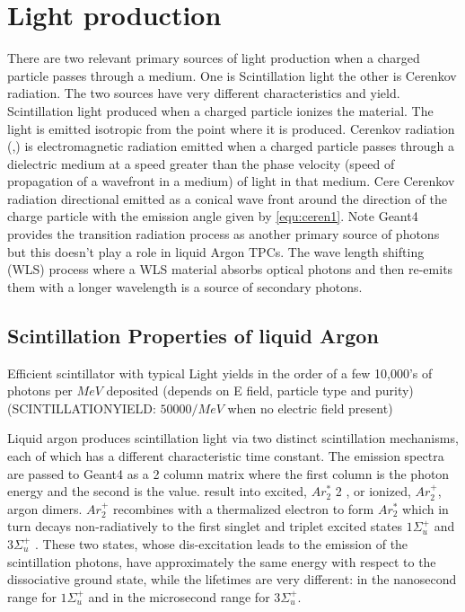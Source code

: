 \documentclass{article}
\begin{document}
  \section{Light production}
  There are two relevant primary sources of light production when a charged particle passes through a medium.
One is Scintillation light the other is Cerenkov radiation.
The two sources have very different characteristics and yield.
Scintillation light produced when a  charged particle ionizes the material. The light is emitted isotropic from the point where it is produced. 
  Cerenkov radiation (\cite{ref:pdg},\cite{ref:wikipedia}) is electromagnetic radiation emitted when a charged particle passes through a dielectric medium at a speed greater than the phase velocity
  (speed of propagation of a wavefront in a medium) of light in that medium. Cere Cerenkov radiation directional  emitted as a conical wave front around the direction of the charge particle with
  the emission angle given by \ref{equ:ceren1}.
  Note Geant4 provides the transition radiation process as another primary source of photons but this doesn't play a role in liquid Argon TPCs.
  The wave length shifting (WLS) process where a WLS material absorbs optical photons and then re-emits them with a longer wavelength is a source of secondary photons. 
  
  
 

  

  \subsection{Scintillation Properties of liquid Argon}

  Efficient scintillator with typical Light yields in the order of a few 10,000’s of photons per $MeV$  deposited (depends on E field, particle type and purity)
  (SCINTILLATIONYIELD: $50000/MeV$ when no electric field present)

  
  Liquid argon produces scintillation light via two distinct scintillation mechanisms, each
  of which has a different characteristic time constant.
  The emission spectra are passed to Geant4
  as a 2 column matrix where the first column is the photon energy and the second is the value.
  result into excited, $Ar^{\ast}_2$ 2 , or ionized, $Ar^+_2$, argon dimers.
$Ar^+_2$ recombines with a thermalized electron
to form $Ar^{\ast}_2$ 
which in turn decays non-radiatively to the first
singlet and triplet excited states  $1\Sigma^+_u$ and  $3\Sigma^+_u$ . These
two states, whose dis-excitation leads to the emission of
the scintillation photons, have approximately the same
energy with respect to the dissociative ground state,
while the lifetimes are very different: in the nanosecond
range for $1\Sigma^+_u$  and in the microsecond range for $3\Sigma^+_u$.
\end{document}
